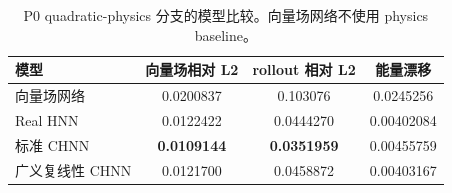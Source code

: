\begin{table}[htbp]
\centering
\caption{P0 quadratic-physics 分支的模型比较。向量场网络不使用 physics baseline。}
\label{tab:p0-summary}
\small
\begin{tabular}{@{}lccc@{}}
\toprule
模型 & 向量场相对 L2 & rollout 相对 L2 & 能量漂移 \\
\midrule
向量场网络 & 0.0200837 & 0.103076 & 0.0245256 \\
Real HNN & 0.0122422 & 0.0444270 & 0.00402084 \\
标准 CHNN & \textbf{0.0109144} & \textbf{0.0351959} & 0.00455759 \\
广义复线性 CHNN & 0.0121700 & 0.0458872 & 0.00403167 \\
\bottomrule
\end{tabular}
\end{table}
